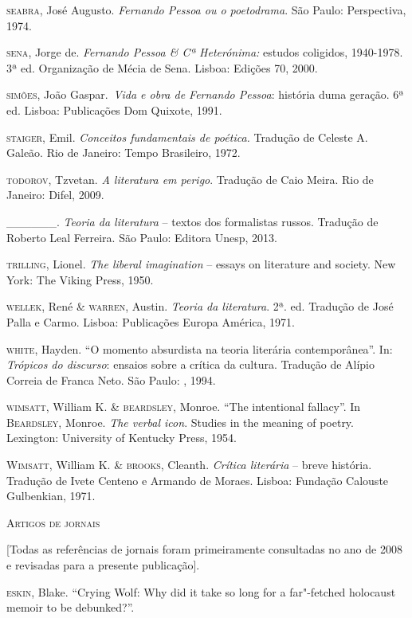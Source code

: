 \begin{Parskip}
\textsc{seabra}, José Augusto. \emph{Fernando Pessoa ou o poetodrama}.
São Paulo: Perspectiva, 1974.

\textsc{sena}, Jorge de. \emph{Fernando Pessoa \& Cª Heterónima:}
estudos coligidos, 1940-1978. 3ª ed. Organização de Mécia de Sena.
Lisboa: Edições 70, 2000.

\textsc{simões}, João Gaspar.~\emph{Vida e obra de Fernando Pessoa}:
história duma geração. 6ª ed. Lisboa: Publicações Dom Quixote, 1991.

\textsc{staiger}, Emil. \emph{Conceitos fundamentais de poética.}
Tradução de Celeste A. Galeão. Rio de Janeiro: Tempo Brasileiro, 1972.

\textsc{todorov, T}zvetan. \emph{A literatura em perigo}. Tradução de
Caio Meira. Rio de Janeiro: Difel, 2009.

\_\_\_\_\_\_. \emph{Teoria da literatura} -- textos dos formalistas
russos. Tradução de Roberto Leal Ferreira. São Paulo: Editora Unesp,
2013.

\textsc{trilling}, Lionel. \emph{The liberal imagination} -- essays on
literature and society. New York: The Viking Press, 1950.

\textsc{wellek,} René \textsc{\& warren,} Austin. \emph{Teoria da
literatura}. 2ª. ed. Tradução de José Palla e Carmo. Lisboa: Publicações
Europa América, 1971.

\textsc{white}, Hayden. ``O momento absurdista na teoria literária
contemporânea''. In: \emph{Trópicos do discurso}: ensaios sobre a
crítica da cultura. Tradução de Alípio Correia de Franca Neto. São
Paulo: , 1994.

\textsc{wimsatt}, William K. \& \textsc{beardsley}, Monroe. ``The
intentional fallacy''. In \textsc{Beardsley}, Monroe. \emph{The verbal
icon}. Studies in the meaning of poetry. Lexington: University of
Kentucky Press, 1954.

\textsc{Wimsatt}, William K. \& \textsc{brooks}, Cleanth. \emph{Crítica
literária} -- breve história. Tradução de Ivete Centeno e Armando de
Moraes. Lisboa: Fundação Calouste Gulbenkian, 1971.

\pagebreak

\textsc{Artigos de jornais}

{[}Todas as referências de jornais foram primeiramente consultadas no
ano de 2008 e revisadas para a presente publicação{]}.

\textsc{eskin}, Blake. ``Crying Wolf: Why did it take so long for a
far"-fetched holocaust memoir to be debunked?''. 


\end{Parskip}
